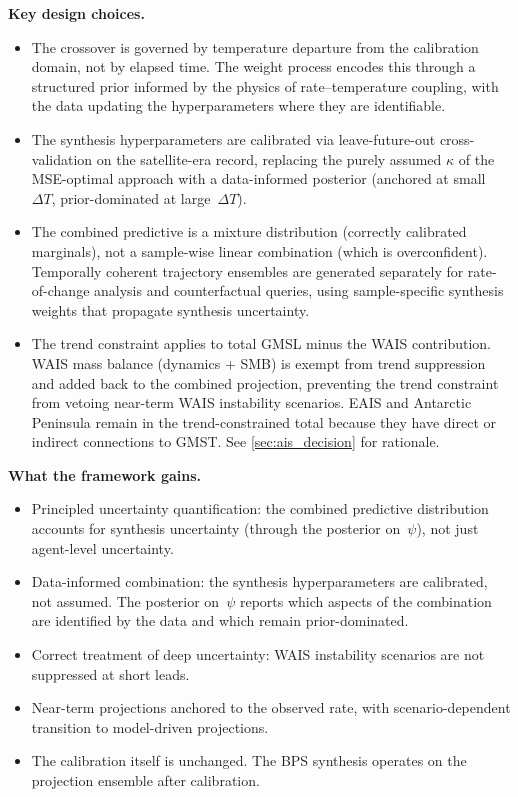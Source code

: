 \documentclass[11pt]{article}
\newcommand{\dT}{\Delta T}
\begin{document}
\textbf{Key design choices.}
\begin{itemize}
  \item The crossover is governed by temperature departure from the calibration domain, not by elapsed time.  The weight process encodes this through a structured prior informed by the physics of rate--temperature coupling, with the data updating the hyperparameters where they are identifiable.
  \item The synthesis hyperparameters are calibrated via leave-future-out cross-validation on the satellite-era record, replacing the purely assumed $\kappa$ of the MSE-optimal approach with a data-informed posterior (anchored at small~$\dT$, prior-dominated at large~$\dT$).
  \item The combined predictive is a mixture distribution (correctly calibrated marginals), not a sample-wise linear combination (which is overconfident).  Temporally coherent trajectory ensembles are generated separately for rate-of-change analysis and counterfactual queries, using sample-specific synthesis weights that propagate synthesis uncertainty.
  \item The trend constraint applies to total GMSL minus the WAIS contribution.  WAIS mass balance (dynamics + SMB) is exempt from trend suppression and added back to the combined projection, preventing the trend constraint from vetoing near-term WAIS instability scenarios.  EAIS and Antarctic Peninsula remain in the trend-constrained total because they have direct or indirect connections to GMST.  See \cref{sec:ais_decision} for rationale.
\end{itemize}

\textbf{What the framework gains.}
\begin{itemize}
  \item Principled uncertainty quantification: the combined predictive distribution accounts for synthesis uncertainty (through the posterior on~$\psi$), not just agent-level uncertainty.
  \item Data-informed combination: the synthesis hyperparameters are calibrated, not assumed.  The posterior on~$\psi$ reports which aspects of the combination are identified by the data and which remain prior-dominated.
  \item Correct treatment of deep uncertainty: WAIS instability scenarios are not suppressed at short leads.
  \item Near-term projections anchored to the observed rate, with scenario-dependent transition to model-driven projections.
  \item The calibration itself is unchanged.  The BPS synthesis operates on the projection ensemble after calibration.
\end{itemize}
\end{document}

